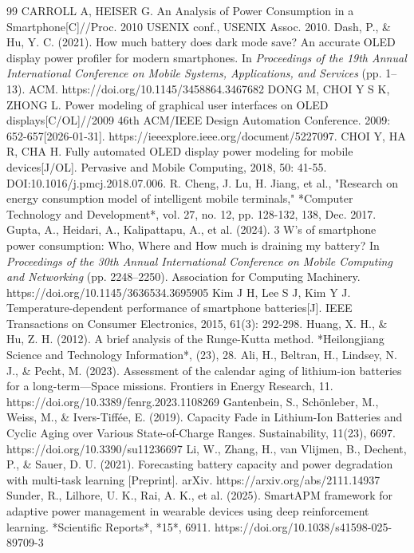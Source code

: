 \documentclass{mcmthesis}  %
\begin{document}
	
	

	
	
	
	\newpage
	\begin{thebibliography}{99}%
	 CARROLL A, HEISER G. An Analysis of Power Consumption in a Smartphone[C]//Proc. 2010 USENIX conf., USENIX Assoc. 2010.
	 Dash, P., \& Hu, Y. C. (2021). How much battery does dark mode save? An accurate OLED display power profiler for modern smartphones. In \textit{Proceedings of the 19th Annual International Conference on Mobile Systems, Applications, and Services} (pp. 1–13). ACM. https://doi.org/10.1145/3458864.3467682
	 DONG M, CHOI Y S K, ZHONG L. Power modeling of graphical user interfaces on OLED displays[C/OL]//2009 46th ACM/IEEE Design Automation Conference. 2009: 652-657[2026-01-31]. https://ieeexplore.ieee.org/document/5227097.
	 CHOI Y, HA R, CHA H. Fully automated OLED display power modeling for mobile devices[J/OL]. Pervasive and Mobile Computing, 2018, 50: 41-55. DOI:10.1016/j.pmcj.2018.07.006.
	 R. Cheng, J. Lu, H. Jiang, et al., "Research on energy consumption model of intelligent mobile terminals," *Computer Technology and Development*, vol. 27, no. 12, pp. 128-132, 138, Dec. 2017.
	 Gupta, A., Heidari, A., Kalipattapu, A., et al. (2024). 3 W’s of smartphone power consumption: Who, Where and How much is draining my battery? In \textit{Proceedings of the 30th Annual International Conference on Mobile Computing and Networking} (pp. 2248–2250). Association for Computing Machinery. https://doi.org/10.1145/3636534.3695905
	Kim J H, Lee S J, Kim Y J. Temperature-dependent performance of smartphone batteries[J]. IEEE Transactions on Consumer Electronics, 2015, 61(3): 292-298.
	Huang, X. H., \& Hu, Z. H. (2012). A brief analysis of the Runge-Kutta method. *Heilongjiang Science and Technology Information*, (23), 28.
	Ali, H., Beltran, H., Lindsey, N. J., \& Pecht, M. (2023). Assessment of the calendar aging of lithium-ion batteries for a long-term—Space missions. Frontiers in Energy Research, 11. https://doi.org/10.3389/fenrg.2023.1108269
	Gantenbein, S., Schönleber, M., Weiss, M., \& Ivers-Tiffée, E. (2019). Capacity Fade in Lithium-Ion Batteries and Cyclic Aging over Various State-of-Charge Ranges. Sustainability, 11(23), 6697. https://doi.org/10.3390/su11236697
	Li, W., Zhang, H., van Vlijmen, B., Dechent, P., \& Sauer, D. U. (2021). Forecasting battery capacity and power degradation with multi-task learning [Preprint]. arXiv. https://arxiv.org/abs/2111.14937
	Sunder, R., Lilhore, U. K., Rai, A. K., et al. (2025). SmartAPM framework for adaptive power management in wearable devices using deep reinforcement learning. *Scientific Reports*, *15*, 6911. https://doi.org/10.1038/s41598-025-89709-3
	\end{thebibliography}
	
\end{document}
